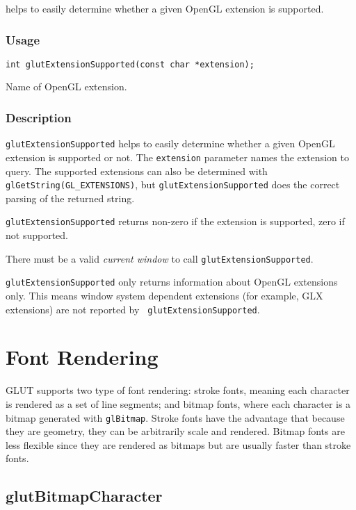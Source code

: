  helps to easily determine whether a given
OpenGL extension is supported.

\subsubsection*{Usage}
\begin{verbatim}
int glutExtensionSupported(const char *extension);
\end{verbatim}
\begin{description}
\itemsep 0in
\item[{\tt extension}]
Name of OpenGL extension.
\end{description}

\subsubsection*{Description}

{\tt glutExtensionSupported} helps to easily determine whether a given
OpenGL extension is supported or not.  The {\tt extension} parameter
names the extension to query.  The supported extensions can also be
determined with {\tt glGetString(GL\_EXTENSIONS)}, but {\tt glutExtensionSupported}
does the correct parsing of the returned string.

{\tt glutExtensionSupported} returns non-zero if the extension is supported,
zero if not supported.

There must be a valid {\em current window} to call {\tt glutExtensionSupported}.

{\tt glutExtensionSupported} only returns information about OpenGL
extensions only.  This means window system dependent extensions (for
example, GLX extensions) are not reported by {\tt
glutExtensionSupported}.

\section{Font Rendering}

GLUT supports two type of font rendering:  stroke fonts,
meaning each character is rendered as a set of line segments;
and bitmap fonts, where each character
is a bitmap generated with {\tt glBitmap}.  Stroke fonts have
the advantage that because they are geometry, they can
be arbitrarily scale and rendered.  Bitmap fonts are
less flexible since they are rendered as bitmaps but are
usually faster than stroke fonts.

\subsection{glutBitmapCharacter}

